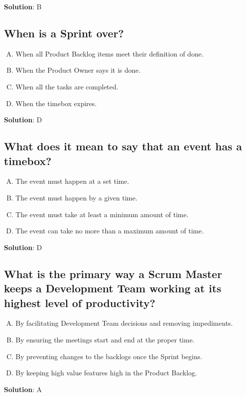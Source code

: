 \textbf{Solution}: B


\subsection{When is a Sprint over?}
\begin{enumerate}[A)]
  \item When all Product Backlog items meet their definition of done.
  \item When the Product Owner says it is done.
  \item When all the tasks are completed.
  \item When the timebox expires.
\end{enumerate}


\textbf{Solution}: D


\subsection{What does it mean to say that an event has a timebox?}
\begin{enumerate}[A)]
  \item The event must happen at a set time.
  \item The event must happen by a given time.
  \item The event must take at least a minimum amount of time.
  \item The event can take no more than a maximum amount of time.
\end{enumerate}


\textbf{Solution}: D


\subsection{What is the primary way a Scrum Master keeps a Development Team working at its highest level of productivity?}
\begin{enumerate}[A)]
  \item By facilitating Development Team decisions and removing impediments.
  \item By ensuring the meetings start and end at the proper time.
  \item By preventing changes to the backlogs once the Sprint begins.
  \item By keeping high value features high in the Product Backlog.
\end{enumerate}


\textbf{Solution}: A



